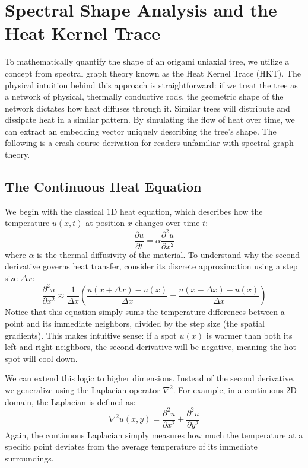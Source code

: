 \documentclass[11pt]{article}
\begin{document}
\section{Spectral Shape Analysis and the Heat Kernel Trace}\label{sec:hkt}

To mathematically quantify the shape of an origami uniaxial tree, we utilize a concept from spectral graph theory known as the Heat Kernel Trace (HKT). The physical intuition behind this approach is straightforward: if we treat the tree as a network of physical, thermally conductive rods, the geometric shape of the network dictates how heat diffuses through it. Similar trees will distribute and dissipate heat in a similar pattern. By simulating the flow of heat over time, we can extract an embedding vector uniquely describing the tree's shape. The following is a crash course derivation for readers unfamiliar with spectral graph theory.

\subsection{The Continuous Heat Equation}
We begin with the classical 1D heat equation, which describes how the temperature $u(x, t)$ at position $x$ changes over time $t$:
\begin{equation}
    \frac{\partial u}{\partial t} = \alpha \frac{\partial^2 u}{\partial x^2}
\end{equation}
where $\alpha$ is the thermal diffusivity of the material. To understand why the second derivative governs heat transfer, consider its discrete approximation using a step size $\Delta x$:
\begin{equation}\label{eq:second_derivative}
    \frac{\partial^2 u}{\partial x^2} \approx \frac{1}{\Delta x} \left( \frac{u(x+\Delta x) - u(x)}{\Delta x} + \frac{u(x-\Delta x) - u(x)}{\Delta x} \right)
\end{equation}
Notice that this equation simply sums the temperature differences between a point and its immediate neighbors, divided by the step size (the spatial gradients). This makes intuitive sense: if a spot $u(x)$ is warmer than both its left and right neighbors, the second derivative will be negative, meaning the hot spot will cool down. 

We can extend this logic to higher dimensions. Instead of the second derivative, we generalize using the Laplacian operator $\nabla^2$. For example, in a continuous 2D domain, the Laplacian is defined as:
\begin{equation}
    \nabla^2 u(x,y) = \frac{\partial^2 u}{\partial x^2} + \frac{\partial^2 u}{\partial y^2}
\end{equation}
Again, the continuous Laplacian simply measures how much the temperature at a specific point deviates from the average temperature of its immediate surroundings.
\end{document}
